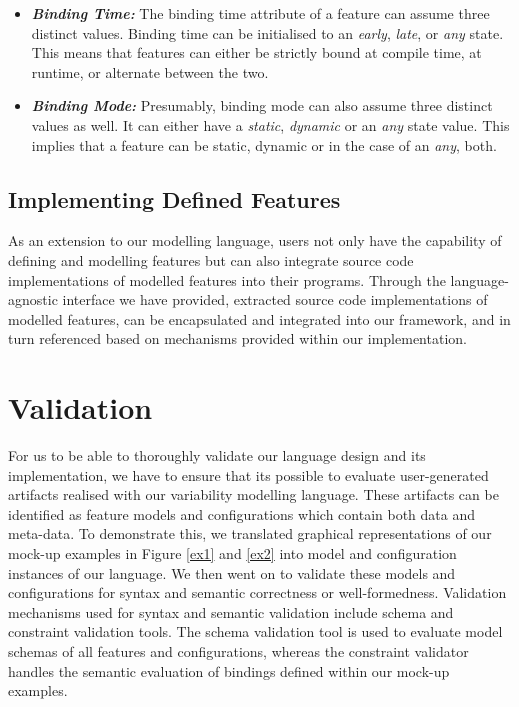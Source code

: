 \documentclass[conference]{IEEEtran}
\begin{document}
\begin{itemize}
\begin{itemize}
    \item \textit{\textbf{Binding Time:}} The binding time attribute of a feature can assume three distinct values. Binding time can be initialised to an \textit{early}, \textit{late}, or \textit{any} state. This means that features can either be strictly bound at compile time, at runtime, or alternate between the two.
    
    \item \textit{\textbf{Binding Mode:}} Presumably, binding mode can also assume three distinct values as well. It can either have a \textit{static}, \textit{dynamic} or an \textit{any} state value. This implies that a feature can be static, dynamic or in the case of an \textit{any}, both.
\end{itemize}

\end{itemize}

\subsection{Implementing Defined Features}
As an extension to our modelling language, users not only have the capability of defining and modelling features but can also integrate source code implementations of modelled features into their programs. Through the language-agnostic interface we have provided, extracted source code implementations of modelled features, can be encapsulated and integrated into our framework, and in turn referenced based on mechanisms provided within our implementation.

\section{Validation}
For us to be able to thoroughly validate our language design and its implementation, we have to ensure that its possible to evaluate user-generated artifacts realised with our variability modelling language. These artifacts can be identified as feature models and configurations which contain both data and meta-data. To demonstrate this, we translated graphical representations of our mock-up examples in Figure \ref{ex1} and \ref{ex2} into model and configuration instances of our language. We then went on to validate these models and configurations for syntax and semantic correctness or well-formedness. Validation mechanisms used for syntax and semantic validation include schema and constraint validation tools. The schema validation tool is used to evaluate model schemas of all features and configurations, whereas the constraint validator handles the semantic evaluation of bindings defined within our mock-up examples.
\end{document}
